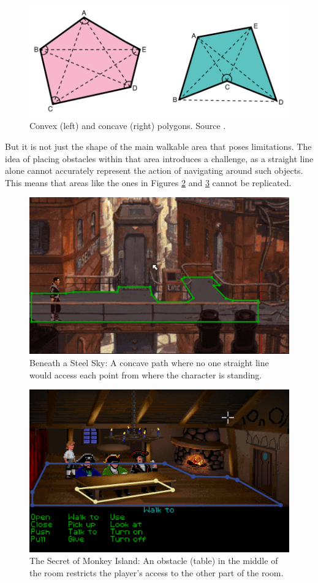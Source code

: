 \begin{figure}[H]
\centering
\includegraphics[width=.8\linewidth]{img/polygons.png}
\caption{Convex (left) and concave (right) polygons. Source \cite{Polygons}.}
\label{fig:Polygons}
\end{figure}

But it is not just the shape of the main walkable area that poses limitations. The idea of placing obstacles within that area introduces a challenge, as a straight line alone cannot accurately represent the action of navigating around such objects. This means that areas like the ones in Figures \ref{fig:Path-B}  and \ref{fig:Path-M}  cannot be replicated.

\begin{figure}[H]
\centering
\includegraphics[width=.7\linewidth]{img/Path-BaSS.png}
\caption{Beneath a Steel Sky: A concave path where no one straight line would access each point from where the character is standing.}
\label{fig:Path-B}
\end{figure}

\begin{figure}[H]
\centering
\includegraphics[width=.7\linewidth]{img/Path-TSoMI.png}
\caption{The Secret of Monkey Island: An obstacle (table) in the middle of the room restricts the player's access to the other part of the room.}
\label{fig:Path-M}
\end{figure}

